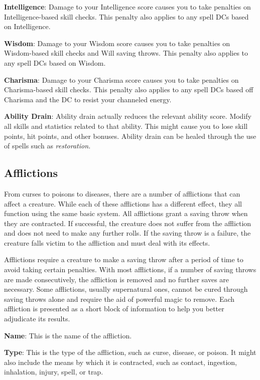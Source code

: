 \textbf{Intelligence}: Damage to your Intelligence score causes you to take penalties on Intelligence-based skill checks. This penalty also applies to any spell DCs based on Intelligence.
				
\textbf{Wisdom}: Damage to your Wisdom score causes you to take penalties on Wisdom-based skill checks and Will saving throws. This penalty also applies to any spell DCs based on Wisdom.
				
\textbf{Charisma}: Damage to your Charisma score causes you to take penalties on Charisma-based skill checks. This penalty also applies to any spell DCs based off Charisma and the DC to resist your channeled energy.
				
\textbf{Ability Drain}: Ability drain actually reduces the relevant ability score. Modify all skills and statistics related to that ability. This might cause you to lose skill points, hit points, and other bonuses. Ability drain can be healed through the use of spells such as \textit{restoration.}
								
\subsection{Afflictions}

				
From curses to poisons to diseases, there are a number of afflictions that can affect a creature. While each of these afflictions has a different effect, they all function using the same basic system. All afflictions grant a saving throw when they are contracted. If successful, the creature does not suffer from the affliction and does not need to make any further rolls. If the saving throw is a failure, the creature falls victim to the affliction and must deal with its effects.
				
Afflictions require a creature to make a saving throw after a period of time to avoid taking certain penalties. With most afflictions, if a number of saving throws are made consecutively, the affliction is removed and no further saves are necessary. Some afflictions, usually supernatural ones, cannot be cured through saving throws alone and require the aid of powerful magic to remove. Each affliction is presented as a short block of information to help you better adjudicate its results. 
				
\textbf{Name}: This is the name of the affliction. 
				
\textbf{Type}: This is the type of the affliction, such as curse, disease, or poison. It might also include the means by which it is contracted, such as contact, ingestion, inhalation, injury, spell, or trap.
				
